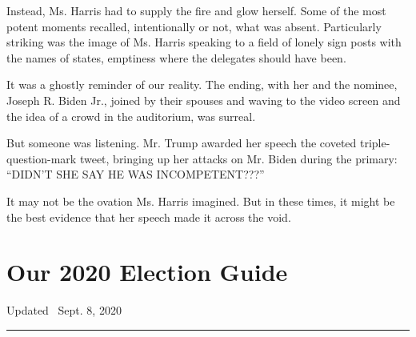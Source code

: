 Instead, Ms. Harris had to supply the fire and glow herself. Some of the
most potent moments recalled, intentionally or not, what was absent.
Particularly striking was the image of Ms. Harris speaking to a field of
lonely sign posts with the names of states, emptiness where the
delegates should have been.

It was a ghostly reminder of our reality. The ending, with her and the
nominee, Joseph R. Biden Jr., joined by their spouses and waving to the
video screen and the idea of a crowd in the auditorium, was surreal.

But someone was listening. Mr. Trump awarded her speech the coveted
triple-question-mark tweet, bringing up her attacks on Mr. Biden during
the primary: ``DIDN'T SHE SAY HE WAS INCOMPETENT???''

It may not be the ovation Ms. Harris imagined. But in these times, it
might be the best evidence that her speech made it across the void.

\hypertarget{our-2020-election-guide}{%
\section{Our 2020 Election Guide}\label{our-2020-election-guide}}

Updated ~Sept. 8, 2020

\begin{center}\rule{0.5\linewidth}{\linethickness}\end{center}

